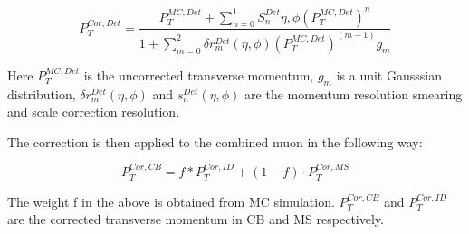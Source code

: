 
\begin{equation}
P_{T}^{Cor,Det} = \frac{P^{MC, Det}_{T} + \sum_{n=0}^{1} S_{n}^{Det}{\eta, \phi}(P_{T}^{MC, Det})^n}{1+\sum_{m=0}^{2}\delta r_{m}^{Det}(\eta, \phi)(P_{T}^{MC, Det})^(m-1) g_{m}}
\label{eq:muoncalib}
\end{equation}

Here $P_{T}^{MC, Det}$ is the uncorrected transverse momentum, $g_m$ is a unit Gausssian distribution, $\delta r^{Det}_{m}(\eta, \phi)$ and $s_{n}^{Det}(\eta, \phi)$ are the momentum resolution smearing and scale correction resolution. 

The correction is then applied to the combined muon in the following way:

\begin{equation}
P_{T}^{Cor, CB} = f *P_{T}^{Cor, ID}+ (1-f) \cdot P_{T}^{Cor, MS}
\label{eq:muoncalibfactor}
\end{equation}

The weight f in the above is obtained from MC simulation. $P_T^{Cor, CB}$ and $P_T^{Cor,ID}$ are the corrected transverse momentum in CB and MS respectively.





%
%
%
%
%
%

